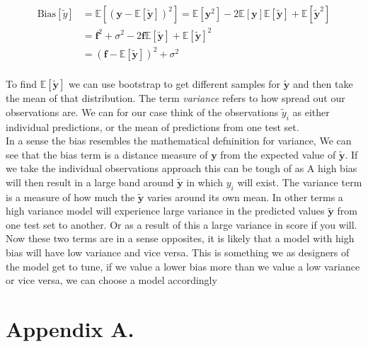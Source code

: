 \documentclass[twoside,11pt]{report}
\begin{document}
\begin{align*}
\mathrm{Bias}[\tilde{y}]& =\mathbb{E}\left[\left(\boldsymbol{y}-\mathbb{E}\left[\boldsymbol{\tilde{y}}\right]\right)^2\right] = \mathbb{E}[\boldsymbol{y}^2] - 2\mathbb{E}[\boldsymbol{y}]\mathbb{E}[\boldsymbol{\tilde{y}}] + \mathbb{E}[\boldsymbol{\tilde{y}}^2]\\
& = \boldsymbol{f}^2 + \sigma^2 - 2\boldsymbol{f}\mathbb{E}[\boldsymbol{\tilde{y}}] + \mathbb{E}[\boldsymbol{\tilde{y}}]^2\\
& = (\boldsymbol{f} - \mathbb{E}[\boldsymbol{\tilde{y}}])^2 + \sigma^2\\
\end{align*}


To find $\mathbb{E}[\boldsymbol{\tilde{y}}]$ we can use bootstrap to get different samples for $\boldsymbol{\tilde{y}}$ and then take the mean of that distribution.
The term \emph{variance} refers to how spread out our observations are. We can for our case think of the observations $\tilde{y}_i$
as either individual predictions, or the mean of predictions from one test set.\\
In a sense the bias resembles the mathematical defninition for variance, We can see that the bias term is a distance measure of $\boldsymbol{y}$ from the expected value of $\boldsymbol{\tilde{y}}$. If we take the individual observations approach this can be tough of as A high bias will then result in a large band around $\boldsymbol{\tilde{y}}$ in which $y_i$ will exist. The variance term is a measure of how much the $\boldsymbol{\tilde{y}}$ varies around its own mean. In other terms a high variance model will experience large variance in the predicted values $\boldsymbol{\tilde{y}}$ from one test set to another. Or as a result of this a large variance in score if you will. Now these two terms are in a sense opposites, it is likely that a model with high bias will have low variance and vice versa. This is something we as designers of the model get to tune, if we value a lower bias more than we value a low variance or vice versa, we can choose a model accordingly

\acks{}


\newpage

\appendix
\section*{Appendix A.}
\label{app:theorem}




\vskip 0.2in

% 

\end{document}
